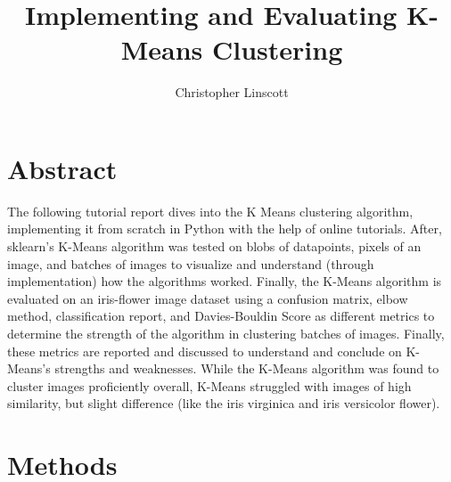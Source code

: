 \documentclass[10pt,twocolumn]{article}
\title{Implementing and Evaluating K-Means Clustering}
\author{Christopher Linscott}
\affiliation{Occidental College}
\begin{document}
\maketitle


\section {Abstract}


The following tutorial report dives into the K Means clustering algorithm, implementing it from scratch in Python with the help of online tutorials. After, sklearn's K-Means algorithm was tested on blobs of datapoints, pixels of an image, and batches of images to visualize and understand (through implementation) how the algorithms worked. Finally, the K-Means algorithm is evaluated on an iris-flower image dataset using a confusion matrix, elbow method, classification report, and Davies-Bouldin Score as different metrics to determine the strength of the algorithm in clustering batches of images. Finally, these metrics are reported and discussed to understand and conclude on K-Means's strengths and weaknesses. While the K-Means algorithm was found to cluster images proficiently overall, K-Means struggled with images of high similarity, but slight difference (like the iris virginica and iris versicolor flower).

\section {Methods}
\end{document}
